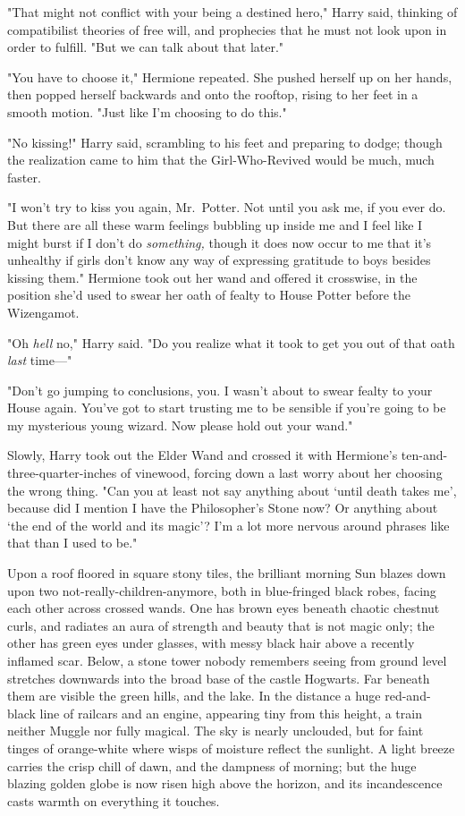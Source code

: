 "That might not conflict with your being a destined hero," Harry said, thinking
of compatibilist theories of free will, and prophecies that he must not look
upon in order to fulfill. "But we can talk about that later."

"You have to choose it," Hermione repeated. She pushed herself up on her hands,
then popped herself backwards and onto the rooftop, rising to her feet in a
smooth motion. "Just like I'm choosing to do this."

"No kissing!" Harry said, scrambling to his feet and preparing to dodge; though
the realization came to him that the Girl-Who-Revived would be much, much
faster.

"I won't try to kiss you again, Mr.~Potter. Not until you ask me, if you ever
do. But there are all these warm feelings bubbling up inside me and I feel like
I might burst if I don't do \emph{something,} though it does now occur to me
that it's unhealthy if girls don't know any way of expressing gratitude to boys
besides kissing them." Hermione took out her wand and offered it crosswise, in
the position she'd used to swear her oath of fealty to House Potter before the
Wizengamot.

"Oh \emph{hell} no," Harry said. "Do you realize what it took to get you out of
that oath \emph{last} time—"

"Don't go jumping to conclusions, you. I wasn't about to swear fealty to your
House again. You've got to start trusting me to be sensible if you're going to
be my mysterious young wizard. Now please hold out your wand."

Slowly, Harry took out the Elder Wand and crossed it with Hermione's
ten-and-three-quarter-inches of vinewood, forcing down a last worry about her
choosing the wrong thing. "Can you at least not say anything about `until death
takes me', because did I mention I have the Philosopher's Stone now? Or
anything about `the end of the world and its magic'? I'm a lot more nervous
around phrases like that than I used to be."

\sbreak

Upon a roof floored in square stony tiles, the brilliant morning Sun blazes
down upon two not-really-children-anymore, both in blue-fringed black robes,
facing each other across crossed wands. One has brown eyes beneath chaotic
chestnut curls, and radiates an aura of strength and beauty that is not magic
only; the other has green eyes under glasses, with messy black hair above a
recently inflamed scar. Below, a stone tower nobody remembers seeing from
ground level stretches downwards into the broad base of the castle Hogwarts.
Far beneath them are visible the green hills, and the lake. In the distance a
huge red-and-black line of railcars and an engine, appearing tiny from this
height, a train neither Muggle nor fully magical. The sky is nearly unclouded,
but for faint tinges of orange-white where wisps of moisture reflect the
sunlight. A light breeze carries the crisp chill of dawn, and the dampness of
morning; but the huge blazing golden globe is now risen high above the horizon,
and its incandescence casts warmth on everything it touches.

